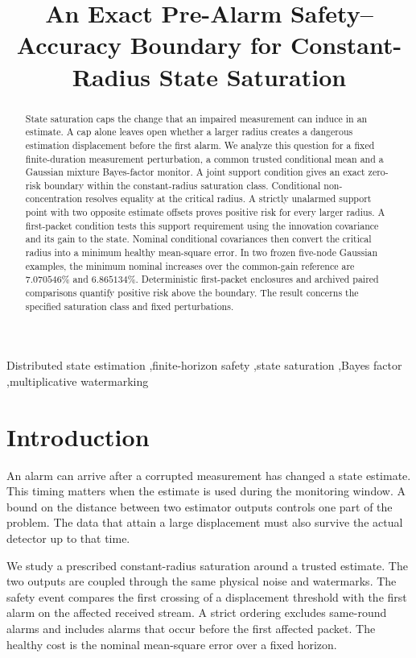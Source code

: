 \documentclass[preprint,11pt]{elsarticle}
\begin{document}
\begin{frontmatter}
\title{An Exact Pre-Alarm Safety--Accuracy Boundary for Constant-Radius State Saturation}
\begin{abstract}
State saturation caps the change that an impaired measurement can induce in an estimate. A cap alone leaves open whether a larger radius creates a dangerous estimation displacement before the first alarm. We analyze this question for a fixed finite-duration measurement perturbation, a common trusted conditional mean and a Gaussian mixture Bayes-factor monitor. A joint support condition gives an exact zero-risk boundary within the constant-radius saturation class. Conditional non-concentration resolves equality at the critical radius. A strictly unalarmed support point with two opposite estimate offsets proves positive risk for every larger radius. A first-packet condition tests this support requirement using the innovation covariance and its gain to the state. Nominal conditional covariances then convert the critical radius into a minimum healthy mean-square error. In two frozen five-node Gaussian examples, the minimum nominal increases over the common-gain reference are \(7.070546\%\) and \(6.865134\%\). Deterministic first-packet enclosures and archived paired comparisons quantify positive risk above the boundary. The result concerns the specified saturation class and fixed perturbations.
\end{abstract}
\begin{keyword}
Distributed state estimation \sep finite-horizon safety \sep state saturation \sep Bayes factor \sep multiplicative watermarking
\end{keyword}
\end{frontmatter}

\section{Introduction}

An alarm can arrive after a corrupted measurement has changed a state estimate. This timing matters when the estimate is used during the monitoring window. A bound on the distance between two estimator outputs controls one part of the problem. The data that attain a large displacement must also survive the actual detector up to that time.

We study a prescribed constant-radius saturation around a trusted estimate. The two outputs are coupled through the same physical noise and watermarks. The safety event compares the first crossing of a displacement threshold with the first alarm on the affected received stream. A strict ordering excludes same-round alarms and includes alarms that occur before the first affected packet. The healthy cost is the nominal mean-square error over a fixed horizon.
\end{document}
